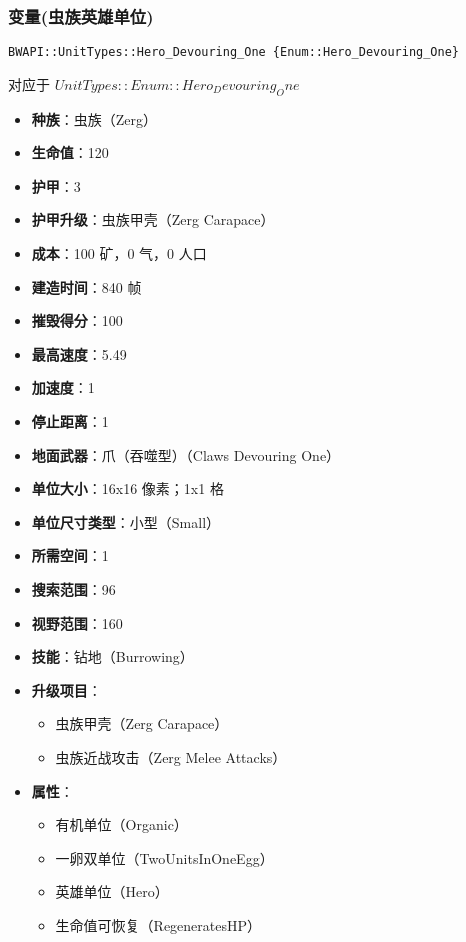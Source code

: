 \subsubsection{变量(虫族英雄单位)}

\begin{tcolorbox}[colback=white, colframe=black!60!white, title=Hero\_Devouring\_One(), arc=0mm]
    \begin{verbatim}
BWAPI::UnitTypes::Hero_Devouring_One {Enum::Hero_Devouring_One}
    \end{verbatim}
    对应于  $ UnitTypes::Enum::Hero_Devouring_One $ 
    \begin{itemize}
        \item \textbf{种族}：虫族（Zerg）
        \item \textbf{生命值}：120
        \item \textbf{护甲}：3
        \item \textbf{护甲升级}：虫族甲壳（Zerg Carapace）
        \item \textbf{成本}：100 矿，0 气，0 人口
        \item \textbf{建造时间}：840 帧
        \item \textbf{摧毁得分}：100
        \item \textbf{最高速度}：5.49
        \item \textbf{加速度}：1
        \item \textbf{停止距离}：1
        \item \textbf{地面武器}：爪（吞噬型）（Claws Devouring One）
        \item \textbf{单位大小}：16x16 像素；1x1 格
        \item \textbf{单位尺寸类型}：小型（Small）
        \item \textbf{所需空间}：1
        \item \textbf{搜索范围}：96
        \item \textbf{视野范围}：160
        \item \textbf{技能}：钻地（Burrowing）
        \item \textbf{升级项目}：
            \begin{itemize}
                \item 虫族甲壳（Zerg Carapace）
                \item 虫族近战攻击（Zerg Melee Attacks）
            \end{itemize}
        \item \textbf{属性}：
            \begin{itemize}
                \item 有机单位（Organic）
                \item 一卵双单位（TwoUnitsInOneEgg）
                \item 英雄单位（Hero）
                \item 生命值可恢复（RegeneratesHP）
            \end{itemize}
    \end{itemize}
\end{tcolorbox}

